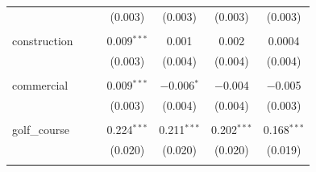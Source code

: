 \documentclass{article}
\begin{document}
\begin{table}[H]
\begin{tabular}{@{\extracolsep{-5pt}}lcccccc}
  &  &  & (0.003) & (0.003) & (0.003) & (0.003) \\ 
  & & & & & & \\ 
 construction &  &  & 0.009$^{***}$ & 0.001 & 0.002 & 0.0004 \\ 
  &  &  & (0.003) & (0.004) & (0.004) & (0.004) \\ 
  & & & & & & \\ 
 commercial &  &  & 0.009$^{***}$ & $-$0.006$^{*}$ & $-$0.004 & $-$0.005 \\ 
  &  &  & (0.003) & (0.004) & (0.004) & (0.003) \\ 
  & & & & & & \\ 
 golf\_course &  &  & 0.224$^{***}$ & 0.211$^{***}$ & 0.202$^{***}$ & 0.168$^{***}$ \\ 
  &  &  & (0.020) & (0.020) & (0.020) & (0.019) \\ 
  & & & & & & \\ 

\end{tabular}
\end{table}
\end{document}
